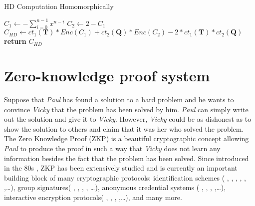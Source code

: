 \begin{algorithm}
\caption{HD Computation Homomorphically}\label{alg:EvalDistance}
\begin{algorithmic}[1]
\State $C_1 \gets - \sum_{i=0}^{n-1}x^{n-i}$
\State $C_2 \gets 2 - C_1$
\State $C_{HD} \gets ct_1(\mathbf{T})*Enc(C_1) + ct_2(\mathbf{Q})*
Enc(C_2) - 2*ct_1(\mathbf{T})*ct_2(\mathbf{Q})$
\State \textbf{return} $C_{HD}$
\EndProcedure
\end{algorithmic}
\end{algorithm}



\section{Zero-knowledge proof system}
\label{sec:introzkp}
Suppose that \emph{Paul} has found a solution
to a hard problem and he wants to convince \emph{Vicky} that the problem has
been solved by him. \emph{Paul} can simply write out the solution and give it
to \emph{Vicky}. However, \emph{Vicky} could be as
dishonest as to show the solution to others and claim that
it was her who solved the problem. The Zero Knowledge Proof (ZKP) is a
beautiful cryptographic concept allowing \emph{Paul} to produce the proof
in such a way that \emph{Vicky} does not learn any information besides the fact that the problem has been solved. Since introduced
in the 80s \cite{goldwasser1989knowledge}, ZKP has been extensively
studied and is currently an important building block of many cryptographic
protocols: identification schemes ( \cite{fiat1986prove}, \cite{feige1988zero},
\cite{guillou1990paradoxical}, \cite{schnorr1991efficient},
\cite{stern1993new}, \cite{kawachi2008concurrently},\dots), group signatures(
\cite{camenisch1997efficient}, \cite{ateniese2000practical},
\cite{boneh2004short}, \cite{boneh2004group}, \cite{groth2007fully}\dots),
anonymous credential systems ( \cite{camenisch2008efficient},
\cite{camenisch2001efficient}, \cite{belenkiy2009randomizable},
\cite{chase2013malleable},\dots), interactive encryption protocols(
\cite{galil1985symmetric}, \cite{goldreich2009foundations},
\cite{goldwasser2005proof}, \cite{katz2003efficient},\dots), and many more.




